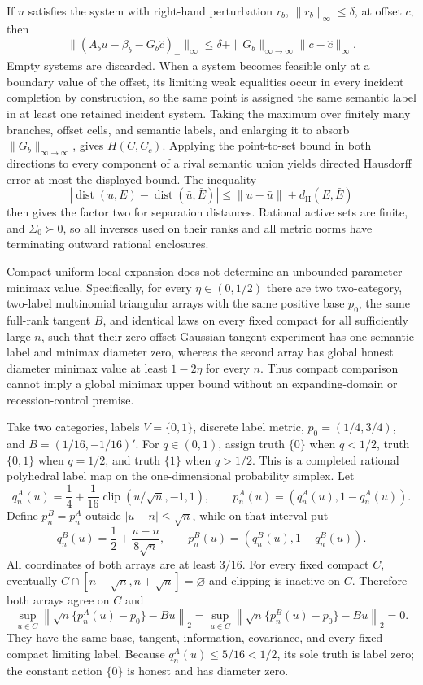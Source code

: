 If \(u\) satisfies the system with right-hand perturbation \(r_b\), \(\|r_b\|_\infty\le\delta\), at offset \(c\), then
\[
 \bigl\|(A_bu-\beta_b-G_b\widehat c)_+\bigr\|_\infty
 \le \delta+\|G_b\|_{\infty\to\infty}\|c-\widehat c\|_\infty.
\]
Empty systems are discarded. When a system becomes feasible only at a boundary value of the offset, its limiting weak equalities occur in every incident completion by construction, so the same point is assigned the same semantic label in at least one retained incident system. Taking the maximum over finitely many branches, offset cells, and semantic labels, and enlarging it to absorb \(\|G_b\|_{\infty\to\infty}\), gives \(H(C,C_c)\). Applying the point-to-set bound in both directions to every component of a rival semantic union yields directed Hausdorff error at most the displayed bound. The inequality
\[
 |\operatorname{dist}(u,E)-\operatorname{dist}(\bar u,\bar E)|
 \le \|u-\bar u\|+d_{\mathrm H}(E,\bar E)
\]
then gives the factor two for separation distances. Rational active sets are finite, and \(\Sigma_0\succ0\), so all inverses used on their ranks and all metric norms have terminating outward rational enclosures.

Compact-uniform local expansion does not determine an unbounded-parameter minimax value. Specifically, for every \(\eta\in(0,1/2)\) there are two two-category, two-label multinomial triangular arrays with the same positive base \(p_0\), the same full-rank tangent \(B\), and identical laws on every fixed compact for all sufficiently large \(n\), such that their zero-offset Gaussian tangent experiment has one semantic label and minimax diameter zero, whereas the second array has global honest diameter minimax value at least \(1-2\eta\) for every \(n\). Thus compact comparison cannot imply a global minimax upper bound without an expanding-domain or recession-control premise.

Take two categories, labels \(V=\{0,1\}\), discrete label metric, \(p_0=(1/4,3/4)\), and \(B=(1/16,-1/16)'\). For \(q\in(0,1)\), assign truth \(\{0\}\) when \(q<1/2\), truth \(\{0,1\}\) when \(q=1/2\), and truth \(\{1\}\) when \(q>1/2\). This is a completed rational polyhedral label map on the one-dimensional probability simplex. Let
\[
 q_n^A(u)=\frac14+\frac1{16}\operatorname{clip}(u/\sqrt n,-1,1),
 \qquad p_n^A(u)=(q_n^A(u),1-q_n^A(u)).
\]
Define \(p_n^B=p_n^A\) outside \(|u-n|\le\sqrt n\), while on that interval put
\[
 q_n^B(u)=\frac12+\frac{u-n}{8\sqrt n},
 \qquad p_n^B(u)=(q_n^B(u),1-q_n^B(u)).
\]
All coordinates of both arrays are at least \(3/16\). For every fixed compact \(C\), eventually \(C\cap[n-\sqrt n,n+\sqrt n]=\varnothing\) and clipping is inactive on \(C\). Therefore both arrays agree on \(C\) and
\[
 \sup_{u\in C}\left\|\sqrt n\{p_n^A(u)-p_0\}-Bu\right\|_2
 =\sup_{u\in C}\left\|\sqrt n\{p_n^B(u)-p_0\}-Bu\right\|_2=0.
\]
They have the same base, tangent, information, covariance, and every fixed-compact limiting label. Because \(q_n^A(u)\le5/16<1/2\), its sole truth is label zero; the constant action \(\{0\}\) is honest and has diameter zero.

